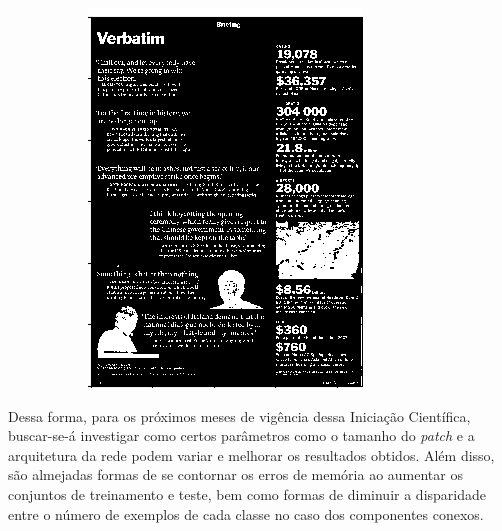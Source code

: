 \documentclass{article}
\begin{document}
\begin{figure}[H]
\begin{subfigure}[b]{90px}
			\includegraphics[width=\textwidth]{15.png}
		\end{subfigure}
	\end{figure}
	
	Dessa forma, para os próximos meses de vigência dessa Iniciação Científica, buscar-se-á investigar como certos parâmetros como o tamanho do \textit{patch} e a arquitetura da rede podem variar e melhorar os resultados obtidos. Além disso, são almejadas formas de se contornar os erros de memória ao aumentar os conjuntos de treinamento e teste, bem como formas de diminuir a disparidade entre o número de exemplos de cada classe no caso dos componentes conexos. 
	
	\newpage
	
	
	
	
	\newpage
	
\end{document}
